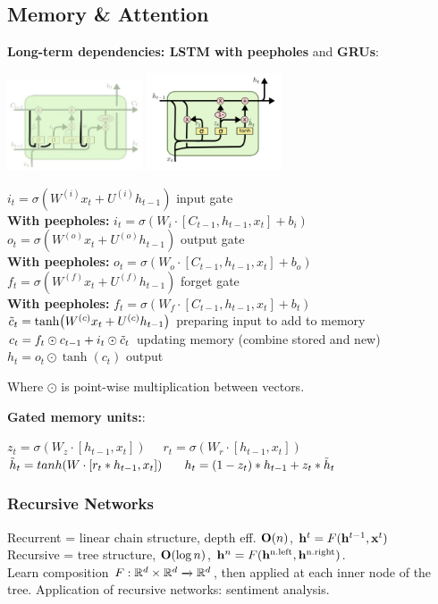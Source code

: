 \subsection{Memory \& Attention}
\label{sub:memoryandattention}
    \textbf{Long-term dependencies: LSTM with peepholes} and \textbf{GRUs}:  
    
    \includegraphics[width=4cm]{images/lstm-peepholes.png}
    \includegraphics[width=4cm]{images/gru.png}

    
    \tab $i_t=\sigma(W^{(i)}x_t+U^{(i)}h_{t-1})$ input gate\\
\textbf{With peepholes:} $i_t=\sigma(W_i\cdot [C_{t-1},h_{t-1}, x_t]+b_i)$\\
    \tab $o_t=\sigma(W^{(o)}x_t+U^{(o)}h_{t-1})$ output gate \\
\textbf{With peepholes:} $o_t=\sigma(W_o\cdot [C_{t-1},h_{t-1}, x_t]+b_o)$\\
    \tab $f_t=\sigma(W^{(f)}x_t+U^{(f)}h_{t-1})$ forget gate\\
\textbf{With peepholes:} $f_t=\sigma(W_f\cdot [C_{t-1},h_{t-1}, x_t]+b_t)$\\
    \tab $\Tilde{c}_t=\tanh(W^{(c)}x_t+U^{(c)}h_{t-1})$ preparing input to add to memory\\
    \tab $c_t=f_t\odot c_{t-1}+i_t\odot \Tilde{c}_t$ updating memory (combine stored and new)\\
    \tab $h_t=o_t\odot\tanh(c_t)$ output
    
    Where $\odot$ is point-wise multiplication between vectors.
    
    \textbf{Gated memory units:}:

    
    $z_t=\sigma(W_z \cdot [h_{t-1},x_t])$
    $\quad r_t=\sigma(W_r \cdot [h_{t-1},x_t])$\\
    $\Tilde{h}_t=tanh(W \cdot [r_t * h_{t-1},x_t])$
    $\quad h_t=(1-z_t)*h_{t-1}+z_t*\Tilde{h}_t$

    
    \subsubsection{Recursive Networks}
    \label{ssub:recursivenetworks}
    Recurrent = linear chain structure, depth eff. $\mathbf O(n)$, $\mathbf h^t=F(\mathbf h^{t-1},\mathbf x^t)$\\
    Recursive = tree structure, $\mathbf O(\log n)$, $\mathbf h^n=F(\mathbf h^\text{n.left},\mathbf h^\text{n.right})$.\\
    Learn composition $F:\mathbb R^d\times\mathbb R^d\xrightarrow{}\mathbb R^d$, then applied at each inner node of the tree. Application of recursive networks: sentiment analysis.
